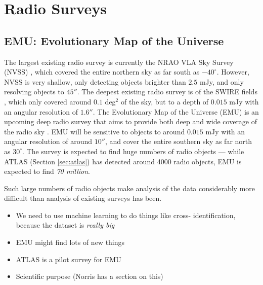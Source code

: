     \section{Radio Surveys}
    \label{sec:radio-surveys}


        \subsection{EMU: Evolutionary Map of the Universe}
        \label{sec:emu}

            The largest existing radio survey is currently the NRAO VLA Sky
            Survey (NVSS) \citep{condon98}, which covered the entire northern
            sky as far south as $-40^\circ$. However, NVSS is very shallow, only
            detecting objects brighter than $2.5$ mJy, and only resolving
            objects to $45''$. The deepest existing radio survey is of the SWIRE
            fields \citep{owen08}, which only covered around $0.1$ deg$^2$ of
            the sky, but to a depth of $0.015$ mJy with an angular resolution of
            $1.6''$. The Evolutionary Map of the Universe (EMU) is an upcoming
            deep radio survey that aims to provide both deep and wide coverage
            of the radio sky \citep{norris11}. EMU will be sensitive to objects
            to around $0.015$ mJy with an angular resolution of around $10''$,
            and cover the entire southern sky as far north as $30^\circ$. The
            survey is expected to find huge numbers of radio objects --- while
            ATLAS (Section \ref{sec:atlas}) has detected around 4000 radio
            objects, EMU is expected to find \emph{70 million}.

            Such large numbers of radio objects make analysis of the data
            considerably more difficult than analysis of existing surveys has
            been.

            \begin{itemize}
                \item We need to use machine learning to do things like cross-
                    identification, because the dataset is \emph{really big}
                \item EMU might find lots of new things
                \item ATLAS is a pilot survey for EMU
                \item Scientific purpose (Norris has a section on this)
            \end{itemize}

